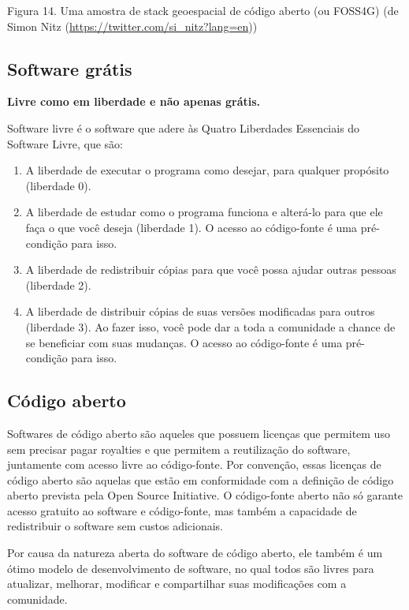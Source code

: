 \documentclass[
]{krantz}
\providecommand{\tightlist}{%
  \setlength{\itemsep}{0pt}\setlength{\parskip}{0pt}}
\begin{document}
Figura 14. Uma amostra de stack geoespacial de código aberto (ou FOSS4G) (de Simon Nitz (\url{https://twitter.com/si_nitz?lang=en}))

\hypertarget{software-gruxe1tis}{%
\subsection{Software grátis}\label{software-gruxe1tis}}

\textbf{Livre como em liberdade e não apenas grátis.}

Software livre é o software que adere às Quatro Liberdades Essenciais do Software Livre, que são:

\begin{enumerate}
\def\labelenumi{\arabic{enumi}.}
\tightlist
\item
  A liberdade de executar o programa como desejar, para qualquer propósito (liberdade 0).
\item
  A liberdade de estudar como o programa funciona e alterá-lo para que ele faça o que você deseja (liberdade 1). O acesso ao código-fonte é uma pré-condição para isso.
\item
  A liberdade de redistribuir cópias para que você possa ajudar outras pessoas (liberdade 2).
\item
  A liberdade de distribuir cópias de suas versões modificadas para outros (liberdade 3). Ao fazer isso, você pode dar a toda a comunidade a chance de se beneficiar com suas mudanças. O acesso ao código-fonte é uma pré-condição para isso.
\end{enumerate}

\hypertarget{cuxf3digo-aberto}{%
\subsection{Código aberto}\label{cuxf3digo-aberto}}

Softwares de código aberto são aqueles que possuem licenças que permitem uso sem precisar pagar royalties e que permitem a reutilização do software, juntamente com acesso livre ao código-fonte. Por convenção, essas licenças de código aberto são aquelas que estão em conformidade com a definição de código aberto prevista pela Open Source Initiative. O código-fonte aberto não só garante acesso gratuito ao software e código-fonte, mas também a capacidade de redistribuir o software sem custos adicionais.

Por causa da natureza aberta do software de código aberto, ele também é um ótimo modelo de desenvolvimento de software, no qual todos são livres para atualizar, melhorar, modificar e compartilhar suas modificações com a comunidade.
\end{document}
